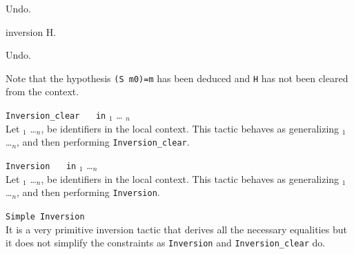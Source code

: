 \begin{itemize}
\begin{coq_example*}
Undo.
\end{coq_example*}
\begin{coq_example}
inversion H.
\end{coq_example}

\begin{coq_eval}
Undo.
\end{coq_eval}

Note that the hypothesis \texttt{(S m0)=m} has been deduced and 
\texttt{H} has not been cleared from the context.

\end{itemize}

\begin{Variants}

\item \texttt{Inversion\_clear } \ident~ \texttt{in} \ident$_1$ \ldots
  \ident$_n$\\ 
  Let \ident$_1$ \ldots \ident$_n$, be identifiers in the local context. This
  tactic behaves as generalizing \ident$_1$ \ldots \ident$_n$, and then performing
  {\tt Inversion\_clear}.

\item \texttt{Inversion } \ident~ \texttt{in} \ident$_1$ \ldots \ident$_n$\\
  Let \ident$_1$ \ldots \ident$_n$, be identifiers in the local context. This
  tactic behaves as generalizing \ident$_1$ \ldots \ident$_n$, and then performing
  \texttt{Inversion}.


\item \texttt{Simple Inversion} \ident~ \\
  It is a very primitive inversion tactic that derives all the necessary
  equalities  but it does not simplify
  the  constraints as \texttt{Inversion} and
  {\tt Inversion\_clear} do.

\end{Variants}


